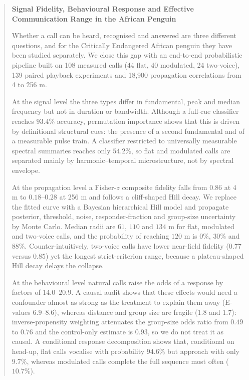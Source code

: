 \documentclass{apmcmthesis}
\begin{document}
\pagestyle{frontmatterstyle}

\begin{abstract}
\begin{center}
\Large\bfseries Signal Fidelity, Behavioural Response and Effective Communication Range in the African Penguin
\end{center}
\vspace{0.4em}

Whether a call can be heard, recognised and answered are three different questions, and for the Critically Endangered African penguin they have been studied separately. We close this gap with an end-to-end probabilistic pipeline built on 108 measured calls (44 flat, 40 modulated, 24 two-voice), 139 paired playback experiments and 18{,}900 propagation correlations from 4 to 256 m.

At the signal level the three types differ in fundamental, peak and median frequency but not in duration or bandwidth. Although a full-cue classifier reaches $93.4\%$ accuracy, permutation importance shows that this is driven by definitional structural cues: the presence of a second fundamental and of a measurable pulse train. A classifier restricted to universally measurable spectral summaries reaches only $54.2\%$, so flat and modulated calls are separated mainly by harmonic--temporal microstructure, not by spectral envelope.

At the propagation level a Fisher-$z$ composite fidelity falls from $0.86$ at 4 m to $0.18$--$0.28$ at 256 m and follows a cliff-shaped Hill decay. We replace the fitted curve with a Bayesian hierarchical Hill model and propagate posterior, threshold, noise, responder-fraction and group-size uncertainty by Monte Carlo. Median radii are $61$, $110$ and $134$ m for flat, modulated and two-voice calls, and the probability of reaching $120$ m is $0\%$, $30\%$ and $88\%$. Counter-intuitively, two-voice calls have lower near-field fidelity ($0.77$ versus $0.85$) yet the longest strict-criterion range, because a plateau-shaped Hill decay delays the collapse.

At the behavioural level natural calls raise the odds of a response by factors of $14.0$--$20.9$. A causal audit shows that these effects would need a confounder almost as strong as the treatment to explain them away (E-values $6.9$--$8.6$), whereas distance and group size are fragile ($1.8$ and $1.7$): inverse-propensity weighting attenuates the group-size odds ratio from $0.49$ to $0.76$ and the control-only estimate is $0.93$, so we do not treat it as causal. A conditional response decomposition shows that, conditional on head-up, flat calls vocalise with probability $94.6\%$ but approach with only $9.7\%$, whereas modulated calls complete the full sequence most often ($10.7\%$).


\end{abstract}
\end{document}
